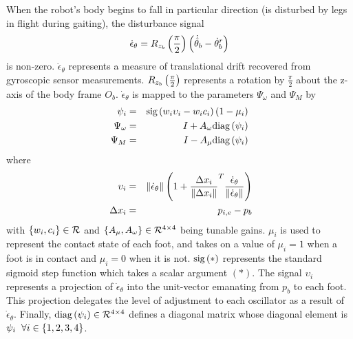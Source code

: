 			When the robot's body begins to fall in particular direction (\IE is disturbed by legs in flight during gaiting), the disturbance signal 
				\begin{equation}
					\dot{\epsilon}_{\theta} = {R}_{z_{b}}\left(\frac{\pi}{2}\right)\left(\dot{\hat{\theta}}_{b} - \dot{\theta}_{b}^{r}\right)
				\end{equation}
			is non-zero. $\dot{\epsilon}_{\theta}$ represents a measure of translational drift recovered from gyroscopic sensor measurements. ${R}_{z_{b}}\left(\frac{\pi}{2}\right)$ represents a rotation by $\frac{\pi}{2}$ about the z-axis of the body frame $O_{b}$. $\dot{\epsilon}_{\theta}$ is mapped to the parameters $\Psi_{\omega}$ and $\Psi_{M}$ by
				\begin{eqnarray}
					\psi_{i} 			&=& \text{sig}\left(  w_{i} \upsilon_{i} - w_{i} c_{i} \right) (1-{\mu}_{i}) 	\nonumber\\
					\Psi_{\omega} 		&=& I + A_{\omega}\text{diag}\left( \psi_{i} \right) 						\nonumber\\
					\Psi_{M}			&=& I - A_{\mu} \text{diag}\left(  \psi_{i} \right) 
					\label{eq::cpg_modulations}
				\end{eqnarray}
			where
				\begin{eqnarray}
					\upsilon_{i} 		&=& \left\lVert \dot{\epsilon}_{\theta} \right\rVert \left(1 + \frac{\Delta x_{i}}{\left\lVert\Delta x_{i}\right\rVert}^T  \frac{ \dot{\epsilon}_{\theta}  }{\left\lVert \dot{\epsilon}_{\theta}  \right\rVert} \right)	\nonumber\\\
					\Delta x_{i}		&=& {p}_{i,e} - {p}_{b}
				\end{eqnarray}
			with $\{w_{i}, c_{i}\} \in{\cal R}^{}$ and $\{A_{\mu}, A_{\omega}\} \in{\cal R}^{4\times4}$ being tunable gains. ${\mu}_{i}$ is used to represent the contact state of each \Ith foot, and takes on a value of ${\mu}_{i}=1$ when a foot is in contact and ${\mu}_{i}=0$ when it is not. $\text{sig}\left(*\right)$ represents the standard sigmoid step function which takes a scalar argument $(*)$. The signal $\upsilon_{i}$ represents a projection of $\dot{\epsilon}_{\theta}$ into the unit-vector emanating from ${p}_{b}$ to each \Ith foot. This projection delegates the level of adjustment to each \Ith oscillator as a result of $\dot{\epsilon}_{\theta}$. Finally, $\text{diag}\left(  \psi_{i} \right) \in {\cal R}^{4\times4}$ defines a diagonal matrix whose \Ith diagonal element is $\psi_{i}\hspace{2mm}\forall i\in\{1,2,3,4\}$.	

